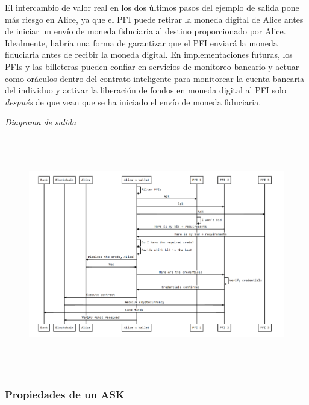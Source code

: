 \documentclass[11pt]{article}
\begin{document}
\vspace{1\baselineskip}
El intercambio de valor real en los dos últimos pasos del ejemplo de salida pone más riesgo en Alice, ya que el PFI puede retirar la moneda digital de Alice antes de iniciar un envío de moneda fiduciaria al destino proporcionado por Alice. \textcolor[HTML]{202124}{Idealmente, habría una forma de garantizar que el PFI enviará la moneda fiduciaria antes de recibir la moneda digital.} En implementaciones futuras, los PFIs y las billeteras pueden confiar en servicios de monitoreo bancario y actuar como oráculos dentro del contrato inteligente para monitorear la cuenta bancaria del individuo y activar la liberación de fondos en moneda digital al PFI solo \textit{después} de que vean que se ha iniciado el envío de moneda fiduciaria\textcolor[HTML]{3C4043}{.}

\vspace{9\baselineskip}
\begin{center}
\textit{\textcolor[HTML]{3C4043}{Diagrama de salida}}
\end{center}

\vspace{1\baselineskip}
\textcolor[HTML]{3C4043}{\begin{figure}[H]
\includegraphics[width=15.48cm,height=10.29cm]{./diagrams/off-ramp.png}
\end{figure}
}

\vspace{1\baselineskip}
\subsubsection{Propiedades de un ASK}
\end{document}
